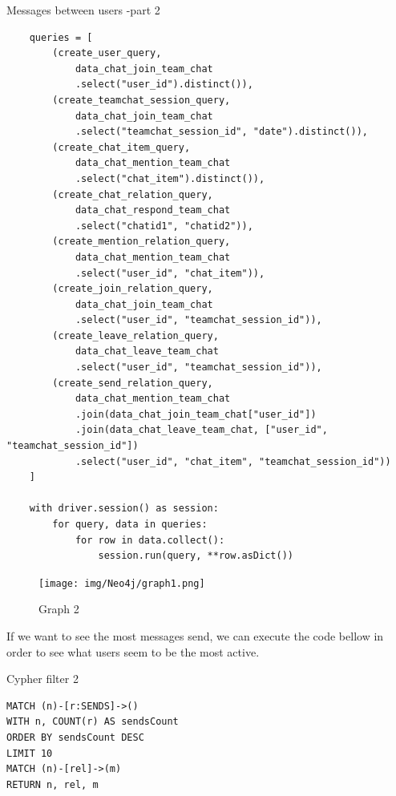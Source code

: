 \begin{listing}[H]
\caption{Messages between users -part 2}
\begin{verbatim}
    queries = [
        (create_user_query, 
            data_chat_join_team_chat
            .select("user_id").distinct()),
        (create_teamchat_session_query, 
            data_chat_join_team_chat
            .select("teamchat_session_id", "date").distinct()),
        (create_chat_item_query, 
            data_chat_mention_team_chat
            .select("chat_item").distinct()),
        (create_chat_relation_query, 
            data_chat_respond_team_chat
            .select("chatid1", "chatid2")),
        (create_mention_relation_query, 
            data_chat_mention_team_chat
            .select("user_id", "chat_item")),
        (create_join_relation_query, 
            data_chat_join_team_chat
            .select("user_id", "teamchat_session_id")),
        (create_leave_relation_query, 
            data_chat_leave_team_chat
            .select("user_id", "teamchat_session_id")),
        (create_send_relation_query, 
            data_chat_mention_team_chat
            .join(data_chat_join_team_chat["user_id"])
            .join(data_chat_leave_team_chat, ["user_id", "teamchat_session_id"])
            .select("user_id", "chat_item", "teamchat_session_id"))
    ]

    with driver.session() as session:
        for query, data in queries:
            for row in data.collect():
                session.run(query, **row.asDict())
\end{verbatim}
\end{listing}

\begin{landscape}
    \begin{figure}[H]
        \texttt{[image: img/Neo4j/graph1.png]}
        \centering
        \caption{Graph 2}
        \label{fig:graph1}
    \end{figure}
\end{landscape}

If we want to see the most messages send, we can execute the code bellow in order to see what users seem to be the most active.
\begin{listing}[H]
\caption{Cypher filter 2}
\begin{verbatim}
MATCH (n)-[r:SENDS]->()
WITH n, COUNT(r) AS sendsCount
ORDER BY sendsCount DESC
LIMIT 10
MATCH (n)-[rel]->(m)
RETURN n, rel, m
\end{verbatim}
\end{listing}

